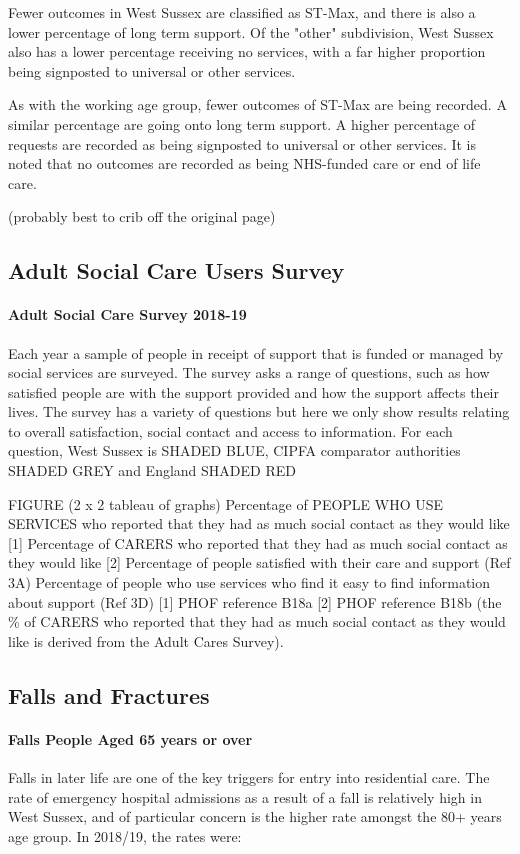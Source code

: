 Fewer outcomes in West Sussex are classified as ST-Max, and there is also a lower percentage of long term support. Of the "other" subdivision, West Sussex also has a lower percentage receiving no services, with a far higher proportion being signposted to universal or other services.

As with the working age group, fewer outcomes of ST-Max are being recorded. A similar percentage are going onto long term support. A higher percentage of requests are recorded as being signposted to universal or other services. It is noted that no outcomes are recorded as being NHS-funded care or end of life care.

(probably best to crib off the original page)

\subsection{Adult Social Care Users Survey}
\paragraph{Adult Social Care Survey 2018-19} Each year a sample of people in receipt of support that is funded or managed by social services are surveyed. The survey asks a range of questions, such as how satisfied people are with the support provided and how the support affects their lives. The survey has a variety of questions but here we only show results relating to overall satisfaction, social contact and access to information. For each question, West Sussex is SHADED BLUE, CIPFA comparator authorities SHADED GREY and England SHADED RED

FIGURE (2 x 2 tableau of graphs)
Percentage of PEOPLE WHO USE SERVICES who reported that they had as much social contact as they would like [1]
Percentage of CARERS who reported that they had as much social contact as they would like [2]
Percentage of people satisfied with their care and support (Ref 3A)
Percentage of people who use services who find it easy to find information about support (Ref 3D)
[1] PHOF reference B18a [2] PHOF reference B18b (the \% of CARERS who reported that they had as much social contact as they would like is derived from the Adult Cares Survey).
\subsection{Falls and Fractures}
\paragraph{Falls People Aged 65 years or over} Falls in later life are one of the key triggers for entry into residential care. The rate of emergency hospital admissions as a result of a fall is relatively high in West Sussex, and of particular concern is the higher rate amongst the 80+ years age group. In 2018/19, the rates were:

